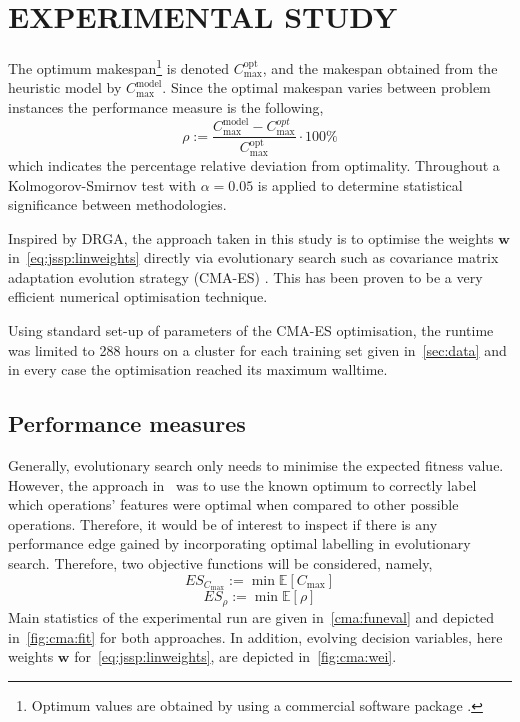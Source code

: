 \documentclass[a4paper,twoside]{article}
\renewcommand{\vec}[1]{\mathbf{#1}}
\newcommand{\Exp}{{\mathbb E}}
\begin{document}
\section{\uppercase{Experimental study}}\label{sec:expr}
The optimum makespan\footnote{Optimum values are obtained by using a commercial software package \cite{gurobi}.} is denoted 
$C_{\max}^{\text{opt}}$, and the makespan obtained from the heuristic model by $C_{\max}^{\text{model}}$. Since 
the optimal makespan varies between problem instances the performance measure is the following, 
\begin{equation}\label{eq:ratio}\rho :=\frac{C_{\max}^{\text{model}}-C_{\max}^{opt}}{C_{\max}^{\text{opt}}}\cdot 
100\%\end{equation}
which indicates the percentage relative deviation from optimality. Throughout a Kolmogorov-Smirnov test with $\alpha=0.05$ is applied to determine statistical significance between methodologies. 

Inspired by DRGA, the approach taken in this study is to optimise the weights $\vec{w}$ in~\cref{eq:jssp:linweights} directly via evolutionary search such as covariance matrix adaptation evolution strategy (CMA-ES) \cite{Hansen01}. This has been proven to be a very efficient numerical optimisation technique. 

Using standard set-up of parameters of the CMA-ES optimisation, the runtime was limited to 288 hours on a cluster for each training set given in~\cref{sec:data} and in every case the optimisation reached its maximum walltime.

\subsection{Performance measures}\label{sec:expr:measure}
Generally, evolutionary search only needs to minimise the expected fitness value. However, the  approach in~\cite{InRu11a} was to use the known optimum to correctly label which operations' features were optimal when compared to other possible operations. Therefore, it would be of interest to inspect if there is any performance edge gained by incorporating optimal labelling in evolutionary search. Therefore, two objective functions will be considered, namely, 
\begin{equation}
ES_{C_{\max}} := \min \Exp[C_{\max}] \label{eq:cma:makespan}
\end{equation}
\begin{equation}
ES_{\rho} := \min \Exp[\rho] \label{eq:cma:rho}
\end{equation} 
Main statistics of the experimental run are given in~\cref{cma:funeval} and depicted in~\cref{fig:cma:fit} for both approaches. In addition, evolving decision variables, here weights $\vec{w}$ for~\cref{eq:jssp:linweights}, are depicted in~\cref{fig:cma:wei}. 
\end{document}
